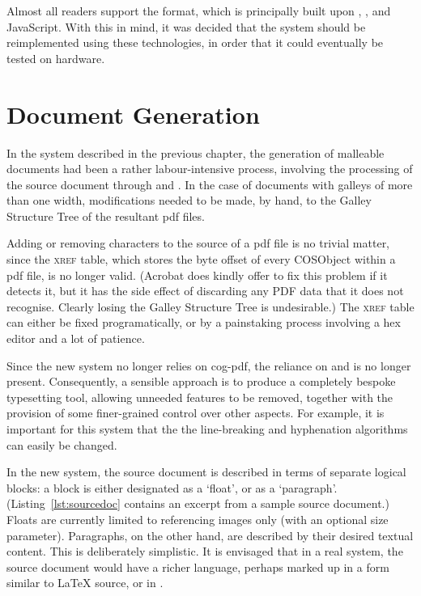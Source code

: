 Almost all \ebook{} readers support the \epub{} format, which is principally built upon \html{}, \css{}, and JavaScript. With this in mind, it was decided that the system should be  reimplemented using these technologies, in order that it could eventually be tested on \ebook{} hardware. 



\section{Document Generation}
\label{sec:docgen}

In the system described in the previous chapter, the generation of malleable documents had been a rather labour-intensive process, involving the processing of the source document through \ditroff{} and \pdfdit{}. In the case of documents with galleys of more than one width, modifications needed to be made, by hand, to the Galley Structure Tree of the resultant \gls{pdf} files.

Adding or removing characters to the source of a \gls{pdf} file is no trivial matter, since the \textsc{xref} table, which stores the byte offset of every \gls{COSObject} within a \gls{pdf} file, is no longer valid. (Acrobat does kindly offer to fix this problem if it detects it, but it has the side effect of discarding any PDF data that it does not recognise. Clearly losing the Galley Structure Tree is undesirable.) The \textsc{xref} table can either be fixed programatically, or by a painstaking process involving a hex editor and a lot of  patience. 

Since the new system no longer relies on \gls{cog}-\gls{pdf}, the reliance on \troff{} and \pdfdit{} is no longer present. Consequently, a sensible approach is to produce a completely bespoke typesetting tool, allowing unneeded features to be removed, together with the provision of some finer-grained control over other aspects. For example, it is important for this system that the the line-breaking and hyphenation algorithms can easily be changed.

In the new system, the source document is described in terms of separate logical blocks: a block is either designated as a `float', or as a `paragraph'. (Listing~\ref{lst:sourcedoc} contains an excerpt from a sample source document.) Floats are currently limited to referencing images only (with an optional size parameter). Paragraphs, on the other hand, are described by their desired textual content. This is deliberately simplistic. It is envisaged that in a real system, the source document would have a richer language, perhaps marked up in a form similar to \LaTeX{} source, or in \xml{}.

